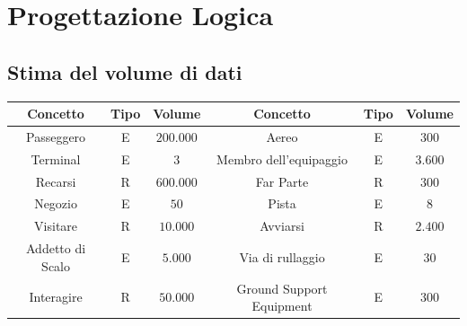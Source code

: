 
\newpage

\enlargethispage{1\linewidth}

\section{Progettazione Logica} 

\subsection{Stima del volume di dati}

\begin{tabular}{ | c  c  c | c  c  c | }
	\hline
	\rowcolor{airforceblue}
	\textbf{\color{white}Concetto} & \textbf{\color{white}Tipo} & \textbf{\color{white}Volume} & \textbf{\color{white}Concetto} & \textbf{\color{white}Tipo} & \textbf{\color{white}Volume}\\
	\hline
	\textsf{\small Passeggero} & \textsf{\small E} & \textsf{\small $ 200.000$} & \textsf{\small Aereo} & \textsf{\small E} & \textsf{\small $ 300 $}\\ %
	\hline
	\textsf{\small Terminal} & \textsf{\small E} & \textsf{\small $ 3 $} & \textsf{\small Membro dell'equipaggio} & \textsf{\small E} & \textsf{\small $ 3.600 $}\\ %
	\hline
	\textsf{\small Recarsi} & \textsf{\small R} & \textsf{\small $ 600.000 $} & \textsf{\small Far Parte} & \textsf{\small R} & \textsf{\small $ 300  $}\\ %
	\hline
	\textsf{\small Negozio} & \textsf{\small E} & \textsf{\small $ 50 $} & \textsf{\small Pista} & \textsf{\small E} & \textsf{\small $ 8 $}\\ %
	\hline
	\textsf{\small Visitare} & \textsf{\small R} & \textsf{\small $ 10.000 $} & \textsf{\small Avviarsi} & \textsf{\small R} & \textsf{\small $ 2.400 $}\\ %
	\hline
	\textsf{\small Addetto di Scalo} & \textsf{\small E} & \textsf{\small $ 5.000 $} & \textsf{\small Via di rullaggio} & \textsf{\small E} & \textsf{\small $ 30 $}\\
	\hline
	\textsf{\small Interagire} & \textsf{\small R} & \textsf{\small $ 50.000 $} & \textsf{\small Ground Support Equipment} & \textsf{\small E} & \textsf{\small $ 300$}\\

\end{tabular}
